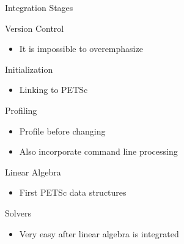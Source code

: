 \begin{frame}{Integration Stages}

\begin{block}{\color{red} Version Control}
  \begin{itemize} \vspace*{-0.1cm}
    \item It is impossible to overemphasize
  \end{itemize} \vspace*{-0.1cm}
\end{block}

\begin{block}{Initialization}
  \begin{itemize} \vspace*{-0.1cm}
    \item Linking to PETSc
  \end{itemize} \vspace*{-0.1cm}
\end{block}

\begin{block}{Profiling}
  \begin{itemize} \vspace*{-0.1cm}
    \item Profile {\color{red} before} changing
    \item Also incorporate command line processing
  \end{itemize} \vspace*{-0.1cm}
\end{block}

\begin{block}{Linear Algebra}
  \begin{itemize} \vspace*{-0.1cm}
    \item First PETSc data structures
  \end{itemize} \vspace*{-0.1cm}
\end{block}

\begin{block}{Solvers}
  \begin{itemize} \vspace*{-0.1cm}
    \item Very easy after linear algebra is integrated
  \end{itemize}
\end{block}

\end{frame}
